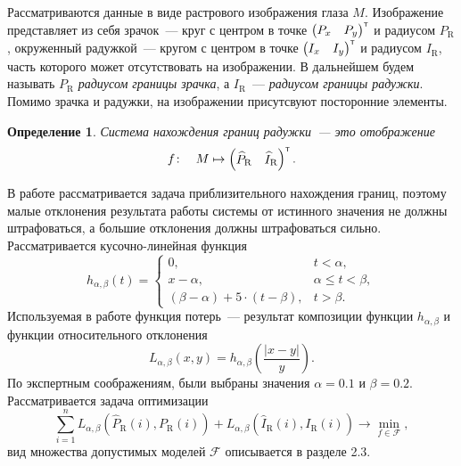 \documentclass[12pt, twoside]{article}
\newtheorem{definition}{Определение}
\begin{document}
Рассматриваются данные в виде растрового изображения глаза $M$. Изображение представляет из себя зрачок~--- круг с центром в точке $\begin{pmatrix}P_x & P_y\end{pmatrix}^{\text{\tiny\sffamily\upshape\mdseries T}}$ и радиусом $P_\text{R}$, окруженный радужкой~--- кругом с центром в точке $\begin{pmatrix}I_x & I_y\end{pmatrix}^{\text{\tiny\sffamily\upshape\mdseries T}}$ и радиусом $I_\text{R}$, часть которого может отсутствовать на изображении. В дальнейшем будем называть $P_\text{R}$ \textit{радиусом границы зрачка}, а $I_\text{R}$~--- \textit{радиусом границы радужки}. Помимо зрачка и радужки, на изображении присутсвуют посторонние элементы.

\begin{definition}
\emph{Система нахождения границ радужки}~--- это отображение
\[f\!: \quad M \mapsto \begin{pmatrix}\widehat{P}_\text{R} &  \widehat{I}_\text{R}\end{pmatrix}^{\text{\tiny\sffamily\upshape\mdseries T}}.\]
\end{definition}
В работе рассматривается задача приблизительного нахождения границ, поэтому малые отклонения результата работы системы от истинного значения не должны штрафоваться, а большие отклонения должны штрафоваться сильно. Рассматривается кусочно-линейная функция
\[
h_{\alpha, \beta}(t) = \begin{cases}0, &t < \alpha, \\ x - \alpha, &\alpha \leqslant t < \beta, \\ (\beta - \alpha) + 5\cdot (t - \beta), & t > \beta.\end{cases}
\]
Используемая в работе функция потерь~--- результат композиции функции $h_{\alpha, \beta}$ и функции относительного отклонения
\[
L_{\alpha, \beta} (x, y) = h_{\alpha, \beta}\left(\frac{|x-y|}{y}\right).
\]
По экспертным соображениям, были выбраны значения $\alpha = 0.1$ и $\beta = 0.2$. Рассматривается задача оптимизации
\begin{equation}\label{mainproblem}
\sum_{i=1}^n L_{\alpha, \beta} \left(\widehat{P}_\text{R}(i), P_\text{R}(i)\right) + L_{\alpha, \beta} \left(\widehat{I}_\text{R}(i), I_\text{R}(i)\right) \to \min_{f\in \mathcal{F}},
\end{equation}
вид множества допустимых моделей $\mathcal{F}$ описывается в разделе 2.3.
\end{document}
